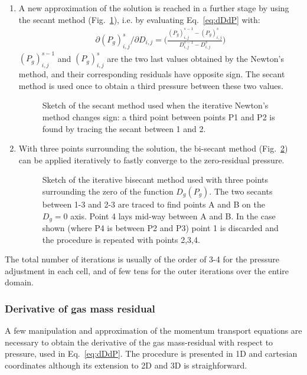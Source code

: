 \begin{enumerate}
\begin{figure}[h]
{$D_g$ changes sign (point 2) the iterative Newton's method is stopped and 
the secant method of Fig.~\ref{fig:secantm} is used.}
\end{figure}
%
\item A new approximation of the solution is reached in a further stage by using the 
secant method (Fig.~\ref{fig:secantm}), i.e. by evaluating Eq.~\ref{eq:dDdP} with:
%
\begin{eqnarray}
\partial (P_g)_{i,j}^{s} / \partial D_{i,j} = \bigg( \frac {(P_g)_{i,j}^{s-1} - (P_g)_{i,j}^{s}}
{D_{i,j}^{s-1} - D_{i,j}^{s}} \bigg)
\nonumber
\end{eqnarray}
%
$(P_g)_{i,j}^{s-1}$ and $(P_g)_{i,j}^{s}$ are the two last values obtained by the Newton's 
method, and their corresponding residuals have opposite sign. The secant method is used once 
to obtain a third pressure between these two values. 
%
\begin{figure}[h]
\centerline{}
\caption{\label{fig:secantm} Sketch of the secant method used when the 
iterative Newton's method changes sign: a third point between points P1 and P2 
is found by tracing the secant between 1 and 2.} 
\end{figure}
%
\item With three points surrounding the solution, the bi-secant method (Fig.~\ref{fig:bisecantm}) 
can be applied iteratively to fastly converge to the zero-residual pressure.
%
\begin{figure}[h]
\centerline{}
\caption{\label{fig:bisecantm} Sketch of the iterative bisecant method used with three points surrounding
the zero of the function $D_g(P_g)$. The two secants between 1-3 and 2-3 are traced to find points
A and B on the $D_g=0$ axis. Point 4 lays mid-way between A and B. In the case shown (where P4 is 
between P2 and P3) point 1 is discarded and the procedure is repeated with points 2,3,4.}
\end{figure}
%
\end{enumerate}
%

The total number of iterations is usually of the order of 3-4 for the pressure adjustment
in each cell, and of few tens for the outer iterations over the entire domain.\\[5mm]
%
\clearpage
\subsubsection{Derivative of gas mass residual}
%
A few manipulation and approximation of the momentum transport equations are necessary
to obtain the derivative of the gas mass-residual with respect to pressure, used in 
Eq.~\ref{eq:dDdP}.
The procedure is presented in 1D and cartesian coordinates although its extension to 2D 
and 3D is straighforward.

